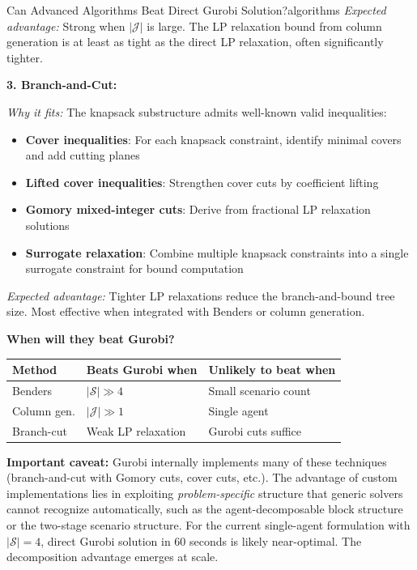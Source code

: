 \documentclass[11pt,a4paper]{article}
\begin{document}
\begin{questionbox}{Can Advanced Algorithms Beat Direct Gurobi Solution?}{algorithms}
\textit{Expected advantage:} Strong when $|\mathcal{J}|$ is large. The LP relaxation bound from column generation is at least as tight as the direct LP relaxation, often significantly tighter.

\textbf{3. Branch-and-Cut:}

\textit{Why it fits:} The knapsack substructure admits well-known valid inequalities:
\begin{itemize}
    \item \textbf{Cover inequalities}: For each knapsack constraint, identify minimal covers and add cutting planes
    \item \textbf{Lifted cover inequalities}: Strengthen cover cuts by coefficient lifting
    \item \textbf{Gomory mixed-integer cuts}: Derive from fractional LP relaxation solutions
    \item \textbf{Surrogate relaxation}: Combine multiple knapsack constraints into a single surrogate constraint for bound computation
\end{itemize}

\textit{Expected advantage:} Tighter LP relaxations reduce the branch-and-bound tree size. Most effective when integrated with Benders or column generation.

\textbf{When will they beat Gurobi?}

\begin{center}
\begin{tabular}{lll}
\toprule
Method & Beats Gurobi when & Unlikely to beat when \\
\midrule
Benders & $|\mathcal{S}| \gg 4$ & Small scenario count \\
Column gen. & $|\mathcal{J}| \gg 1$ & Single agent \\
Branch-cut & Weak LP relaxation & Gurobi cuts suffice \\
\bottomrule
\end{tabular}
\end{center}

\textbf{Important caveat:} Gurobi internally implements many of these techniques (branch-and-cut with Gomory cuts, cover cuts, etc.). The advantage of custom implementations lies in exploiting \textit{problem-specific} structure that generic solvers cannot recognize automatically, such as the agent-decomposable block structure or the two-stage scenario structure. For the current single-agent formulation with $|\mathcal{S}| = 4$, direct Gurobi solution in 60 seconds is likely near-optimal. The decomposition advantage emerges at scale.
\end{questionbox}
\end{document}
